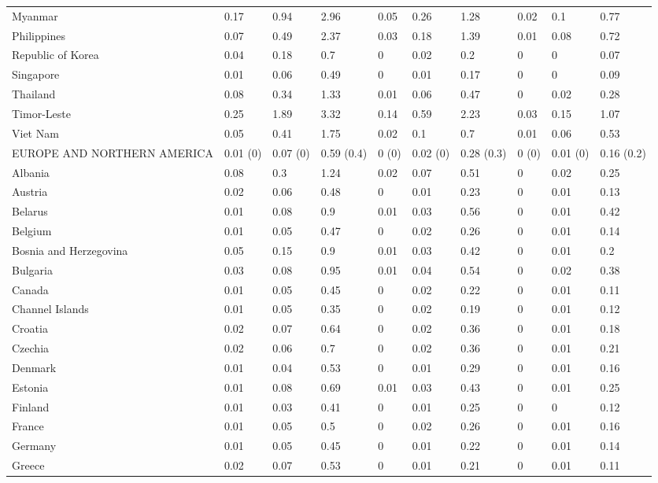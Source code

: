 \begin{longtable}[t]{llllllllll}
Myanmar & 0.17 & 0.94 & 2.96 & 0.05 & 0.26 & 1.28 & 0.02 & 0.1 & 0.77\\
Philippines & 0.07 & 0.49 & 2.37 & 0.03 & 0.18 & 1.39 & 0.01 & 0.08 & 0.72\\
Republic of Korea & 0.04 & 0.18 & 0.7 & 0 & 0.02 & 0.2 & 0 & 0 & 0.07\\
Singapore & 0.01 & 0.06 & 0.49 & 0 & 0.01 & 0.17 & 0 & 0 & 0.09\\
Thailand & 0.08 & 0.34 & 1.33 & 0.01 & 0.06 & 0.47 & 0 & 0.02 & 0.28\\
Timor-Leste & 0.25 & 1.89 & 3.32 & 0.14 & 0.59 & 2.23 & 0.03 & 0.15 & 1.07\\
Viet Nam & 0.05 & 0.41 & 1.75 & 0.02 & 0.1 & 0.7 & 0.01 & 0.06 & 0.53\\
EUROPE AND NORTHERN AMERICA & 0.01 (0) & 0.07 (0) & 0.59 (0.4) & 0 (0) & 0.02 (0) & 0.28 (0.3) & 0 (0) & 0.01 (0) & 0.16 (0.2)\\
Albania & 0.08 & 0.3 & 1.24 & 0.02 & 0.07 & 0.51 & 0 & 0.02 & 0.25\\
Austria & 0.02 & 0.06 & 0.48 & 0 & 0.01 & 0.23 & 0 & 0.01 & 0.13\\
Belarus & 0.01 & 0.08 & 0.9 & 0.01 & 0.03 & 0.56 & 0 & 0.01 & 0.42\\
Belgium & 0.01 & 0.05 & 0.47 & 0 & 0.02 & 0.26 & 0 & 0.01 & 0.14\\
Bosnia and Herzegovina & 0.05 & 0.15 & 0.9 & 0.01 & 0.03 & 0.42 & 0 & 0.01 & 0.2\\
Bulgaria & 0.03 & 0.08 & 0.95 & 0.01 & 0.04 & 0.54 & 0 & 0.02 & 0.38\\
Canada & 0.01 & 0.05 & 0.45 & 0 & 0.02 & 0.22 & 0 & 0.01 & 0.11\\
Channel Islands & 0.01 & 0.05 & 0.35 & 0 & 0.02 & 0.19 & 0 & 0.01 & 0.12\\
Croatia & 0.02 & 0.07 & 0.64 & 0 & 0.02 & 0.36 & 0 & 0.01 & 0.18\\
Czechia & 0.02 & 0.06 & 0.7 & 0 & 0.02 & 0.36 & 0 & 0.01 & 0.21\\
Denmark & 0.01 & 0.04 & 0.53 & 0 & 0.01 & 0.29 & 0 & 0.01 & 0.16\\
Estonia & 0.01 & 0.08 & 0.69 & 0.01 & 0.03 & 0.43 & 0 & 0.01 & 0.25\\
Finland & 0.01 & 0.03 & 0.41 & 0 & 0.01 & 0.25 & 0 & 0 & 0.12\\
France & 0.01 & 0.05 & 0.5 & 0 & 0.02 & 0.26 & 0 & 0.01 & 0.16\\
Germany & 0.01 & 0.05 & 0.45 & 0 & 0.01 & 0.22 & 0 & 0.01 & 0.14\\
Greece & 0.02 & 0.07 & 0.53 & 0 & 0.01 & 0.21 & 0 & 0.01 & 0.11\\

\end{longtable}

